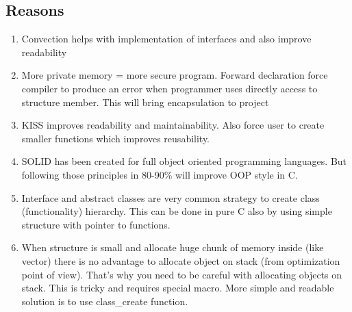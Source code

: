 \subsection{Reasons}
\begin{enumerate}
    \item Convection helps with implementation of interfaces and also improve readability
    \item More private memory = more secure program. Forward declaration force compiler to produce an error when programmer uses directly access to structure member. This will bring encapsulation to project
    \item KISS improves readability and maintainability. Also force user to create smaller functions which improves reusability.
    \item SOLID has been created for full object oriented programming languages. But following those principles in 80-90\% will improve OOP style in C.
    \item Interface and abstract classes are very common strategy to create class (functionality) hierarchy. This can be done in pure C also by using simple structure with pointer to functions.
    \item When structure is small and allocate huge chunk of memory inside (like vector) there is no advantage to allocate object on stack (from optimization point of view). That's why you need to be careful with allocating objects on stack. This is tricky and requires special macro. More simple and readable solution is to use class\_create function.
\end{enumerate}